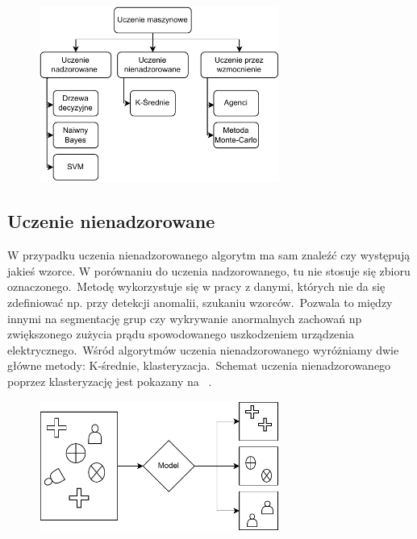 \begin{figure}[H]
    \centering
    \includegraphics[width=0.7\textwidth]{images/ml-przyklady}
    \label{fig:ml-schema}
\end{figure}

\subsection{Uczenie nienadzorowane}
W przypadku uczenia nienadzorowanego algorytm ma sam znaleźć czy występują jakieś wzorce. W porównaniu do uczenia nadzorowanego, tu nie stosuje się zbioru oznaczonego.\ Metodę wykorzystuje się w pracy z danymi, których nie da się zdefiniować np. przy detekcji anomalii, szukaniu wzorców.\ Pozwala to między innymi na segmentację grup czy wykrywanie anormalnych zachowań np zwiększonego zużycia prądu spowodowanego uszkodzeniem urządzenia elektrycznego.\ Wśród algorytmów uczenia nienadzorowanego wyróżniamy dwie główne metody: K-średnie, klasteryzacja.\ Schemat uczenia nienadzorowanego poprzez klasteryzację jest pokazany na ~\cite{AiScience, Mahesh2018}.

\begin{figure}[H]
    \centering
    \includegraphics[width=0.7\textwidth]{images/unsupervised}
    \label{fig:unspervised}
\end{figure}


